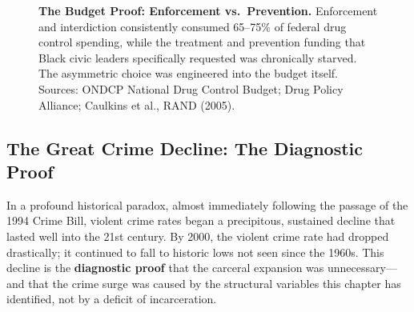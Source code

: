 \documentclass[12pt,openany]{book}
\begin{document}
\begin{figure}[htbp]
\centering
{}
\caption{\textbf{The Budget Proof: Enforcement vs.\ Prevention.} Enforcement and interdiction consistently consumed 65--75\% of federal drug control spending, while the treatment and prevention funding that Black civic leaders specifically requested was chronically starved. The asymmetric choice was engineered into the budget itself. Sources: ONDCP National Drug Control Budget; Drug Policy Alliance; Caulkins et al., RAND (2005).}
\label{fig:drug_spending}
\end{figure}

\subsection{The Great Crime Decline: The Diagnostic Proof}

In a profound historical paradox, almost immediately following the passage of the 1994 Crime Bill, violent crime rates began a precipitous, sustained decline that lasted well into the 21st century. By 2000, the violent crime rate had dropped drastically; it continued to fall to historic lows not seen since the 1960s. This decline is the \textbf{diagnostic proof} that the carceral expansion was unnecessary---and that the crime surge was caused by the structural variables this chapter has identified, not by a deficit of incarceration.
\end{document}

